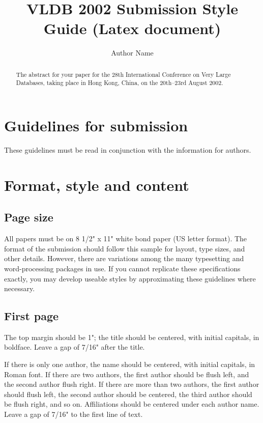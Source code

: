 \documentclass{vldb}
\title{VLDB 2002 Submission Style Guide (Latex document)}
\author{Author Name}
\begin{document}
\maketitle

\begin{abstract}
The abstract for your paper for the 28th International Conference on
Very Large Databases, taking place in Hong Kong, China, on the
20th--23rd August 2002.
\end{abstract}


\section{Guidelines for submission}

These guidelines must be read in conjunction with the information for
authors.

\section{Format, style and content}

\subsection{Page size}

All papers must be on 8 1/2" x 11" white bond paper (US letter format). 
The format of the submission should follow this sample for layout, type
sizes, and other details.  However, there are variations among the many
typesetting and word-processing packages in use.  If you cannot
replicate these specifications exactly, you may develop useable styles
by approximating these guidelines where necessary.


\subsection{First page}

The top margin should be 1"; the title should be centered, with initial
capitals, in boldface. Leave a gap of 7/16" after the title.

If there is only one author, the name should be centered, with initial
capitals, in Roman font. If there are two authors, the first author
should be flush left, and the second author flush right.  If there are
more than two authors, the first author should flush left, the second
author should be centered, the third author should be flush right, and
so on.  Affiliations should be centered under each author name. Leave a
gap of 7/16" to the first line of text.
\end{document}
